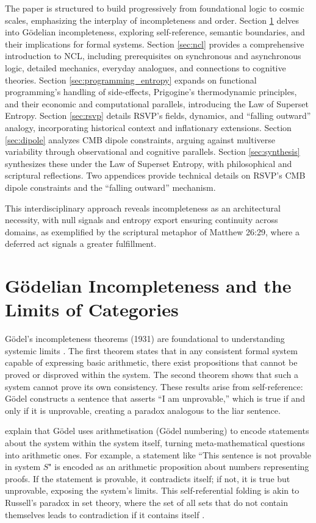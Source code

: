 \documentclass{article}
\begin{document}
The paper is structured to build progressively from foundational logic to cosmic scales, emphasizing the interplay of incompleteness and order. Section \ref{sec:godel} delves into G\"{o}delian incompleteness, exploring self-reference, semantic boundaries, and their implications for formal systems. Section \ref{sec:ncl} provides a comprehensive introduction to NCL, including prerequisites on synchronous and asynchronous logic, detailed mechanics, everyday analogues, and connections to cognitive theories. Section \ref{sec:programming_entropy} expands on functional programming's handling of side-effects, Prigogine's thermodynamic principles, and their economic and computational parallels, introducing the Law of Superset Entropy. Section \ref{sec:rsvp} details RSVP's fields, dynamics, and ``falling outward'' analogy, incorporating historical context and inflationary extensions. Section \ref{sec:dipole} analyzes CMB dipole constraints, arguing against multiverse variability through observational and cognitive parallels. Section \ref{sec:synthesis} synthesizes these under the Law of Superset Entropy, with philosophical and scriptural reflections. Two appendices provide technical details on RSVP's CMB dipole constraints and the ``falling outward'' mechanism.

This interdisciplinary approach reveals incompleteness as an architectural necessity, with null signals and entropy export ensuring continuity across domains, as exemplified by the scriptural metaphor of Matthew 26:29, where a deferred act signals a greater fulfillment.

\section{G\"{o}delian Incompleteness and the Limits of Categories}
\label{sec:godel}
G\"{o}del's incompleteness theorems (1931) are foundational to understanding systemic limits \citep{godel1931}. The first theorem states that in any consistent formal system capable of expressing basic arithmetic, there exist propositions that cannot be proved or disproved within the system. The second theorem shows that such a system cannot prove its own consistency. These results arise from self-reference: G\"{o}del constructs a sentence that asserts ``I am unprovable,'' which is true if and only if it is unprovable, creating a paradox analogous to the liar sentence.

\citet{nagel1958} explain that G\"{o}del uses arithmetisation (G\"{o}del numbering) to encode statements about the system within the system itself, turning meta-mathematical questions into arithmetic ones. For example, a statement like ``This sentence is not provable in system \( S \)" is encoded as an arithmetic proposition about numbers representing proofs. If the statement is provable, it contradicts itself; if not, it is true but unprovable, exposing the system's limits. This self-referential folding is akin to Russell's paradox in set theory, where the set of all sets that do not contain themselves leads to contradiction if it contains itself \citep{tarski1956}.
\end{document}

